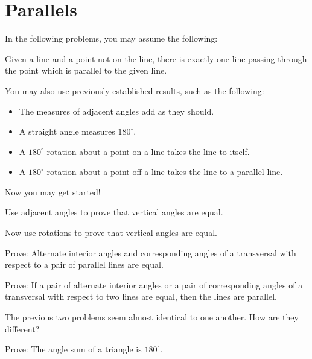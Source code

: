 \newpage

\section{Parallels}
In the following problems, you may assume the following: 

\begin{postulate}
Given a line and a point not on the line, there is exactly one line passing through the point which is parallel to the given line.
\end{postulate}

You may also use previously-established results, such as the following: 
\begin{itemize}
\itemsep -3pt
\item The measures of adjacent angles add as they should.
\item A straight angle measures $180^\circ$.  
\item A $180^\circ$ rotation about a point on a line takes the line to itself.  
\item A $180^\circ$ rotation about a point off a line takes the line to a parallel line.  
\end{itemize}

Now you may get started! 

\begin{prob}
Use adjacent angles to prove that vertical angles are equal.    
\end{prob}

\begin{prob}
Now use rotations to prove that vertical angles are equal.
\end{prob}

\begin{prob}
Prove:  Alternate interior angles and corresponding angles of a transversal with respect to a pair of parallel lines are equal.
\end{prob}

\begin{prob}
Prove: If a pair of alternate interior angles or a pair of corresponding angles of a transversal with respect to two lines are equal, then the lines are parallel.
\end{prob}

\begin{prob}
The previous two problems seem almost identical to one another.  How are they different?  
\end{prob}

\begin{prob}
Prove:  The angle sum of a triangle is $180^\circ$.
\end{prob}

